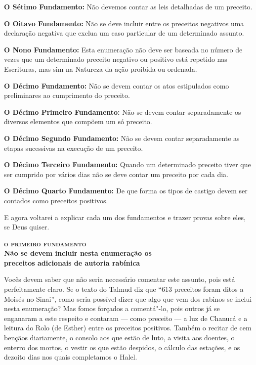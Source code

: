 \textbf{O Sétimo Fundamento:} Não devemos contar as leis detalhadas de
um preceito.

\textbf{O Oitavo Fundamento:} Não se deve incluir entre os preceitos
negativos uma declaração negativa que exclua um caso particular de um
determinado assunto.

\textbf{O Nono Fundamento:} Esta enumeração não deve ser baseada no
número de vezes que um determinado preceito negativo ou positivo está
repetido nas Escrituras, mas sim na Natureza da ação proibida ou
ordenada.

\textbf{O Décimo Fundamento:} Não se devem contar os atos estipulados
como preliminares ao cumprimento do preceito.

\textbf{O Décimo Primeiro Fundamento:} Não se devem contar separadamente
os diversos elementos que compõem um só preceito.

\textbf{O Décimo Segundo Fundamento:} Não se devem contar separadamente
as etapas sucessivas na execução de um preceito.

\textbf{O Décimo Terceiro Fundamento:} Quando um determinado preceito
tiver que ser cumprido por vários dias não se deve contar um preceito
por cada dia.

\textbf{O Décimo Quarto Fundamento:} De que forma os tipos de castigo
devem ser contados como preceitos positivos.

E agora voltarei a explicar cada um dos fundamentos e trazer provas
sobre eles, se Deus quiser.


\bigskip

\noindent\textbf{\textsc{o primeiro fundamento}\\ Não se devem incluir nesta enumeração os\\ preceitos adicionais de autoria rabínica}

\smallskip

Vocês devem saber que não seria necessário comentar este
assunto, pois está perfeitamente claro. Se o texto do Talmud\starr{} diz que
``613 preceitos foram ditos a Moisés no Sinai'', como
seria possível dizer que algo que vem dos rabinos se inclui nesta
enumeração? Mas fomos forçados a comentá"-lo, pois outros já se enganaram
a este respeito e contaram --- como preceito --- a luz de Chanucá\starr{} e
a leitura do Rolo (de Esther) entre os preceitos positivos. Também o
recitar de cem bençãos diariamente, o consolo aos que estão de luto, a
visita aos doentes, o enterro dos mortos, o vestir os que estão
despidos, o cálculo das estações, e os dezoito dias nos quais
completamos o Halel\starr.

